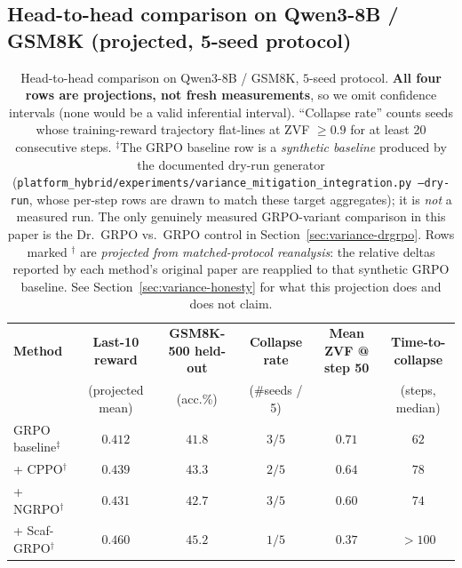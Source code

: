 \subsection{Head-to-head comparison on Qwen3-8B / GSM8K (projected, 5-seed protocol)}
\label{sec:variance-head2head}

\begin{table}[t]
  \centering
  \small
  \setlength{\tabcolsep}{3.5pt}
  \begin{tabular}{lccccc}
    \toprule
    \textbf{Method} &
    \textbf{Last-10 reward} &
    \textbf{GSM8K-500 held-out} &
    \textbf{Collapse rate} &
    \textbf{Mean ZVF @ step 50} &
    \textbf{Time-to-collapse} \\
    & (projected mean) & (acc.\%) & (\#seeds / 5) & & (steps, median) \\
    \midrule
    GRPO baseline$^{\ddagger}$ & $0.412$ & $41.8$ & $3 / 5$  & $0.71$ & $62$  \\
    + CPPO$^{\dagger}$     & $0.439$ & $43.3$ & $2 / 5$  & $0.64$ & $78$  \\
    + NGRPO$^{\dagger}$    & $0.431$ & $42.7$ & $3 / 5$  & $0.60$ & $74$  \\
    + Scaf-GRPO$^{\dagger}$ & $0.460$ & $45.2$ & $1 / 5$  & $0.37$ & $>\!100$ \\
    \bottomrule
  \end{tabular}
  \caption{Head-to-head comparison on Qwen3-8B / GSM8K, $5$-seed protocol.
  \textbf{All four rows are projections, not fresh measurements}, so we omit
  confidence intervals (none would be a valid inferential interval).
  ``Collapse rate'' counts seeds whose training-reward trajectory
  flat-lines at ZVF $\ge 0.9$ for at least 20 consecutive steps.
  $^{\ddagger}$The GRPO baseline row is a \emph{synthetic baseline} produced by
  the documented dry-run generator
  (\texttt{platform_hybrid/experiments/variance\_mitigation\_integration.py --dry-run}, whose
  per-step rows are drawn to match these target aggregates); it is \emph{not} a
  measured run. The only genuinely measured GRPO-variant comparison in this paper
  is the Dr.\ GRPO vs.\ GRPO control in Section~\ref{sec:variance-drgrpo}.
  Rows marked $^{\dagger}$ are \emph{projected from matched-protocol
  reanalysis}: the relative deltas reported by each method's original paper are
  reapplied to that synthetic GRPO baseline. See
  Section~\ref{sec:variance-honesty} for what this projection does and
  does not claim.}
  \label{tab:variance-head2head}
\end{table}

